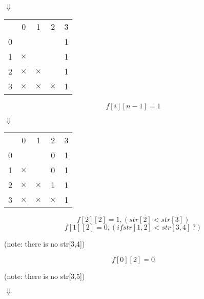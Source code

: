 \documentclass[a4paper,12pt]{article}
\begin{document}
\begin{center}
$\Downarrow$
\end{center}

\begin{center}
    \begin{tabular}{ r|c|c|c|c| }
        \multicolumn{1}{r}{} & \multicolumn{1}{c}{0} & \multicolumn{1}{c}{1} & \multicolumn{1}{c}{2} & \multicolumn{1}{c}{3}\\
        \cline{2-5}
        0 & \ & \ & \ & 1 \\
        \cline{2-5}
        1 & $\times$ & \ & \ & 1 \\
        \cline{2-5}
        2 & $\times$ & $\times$ & \ & 1 \\
        \cline{2-5}
        3 & $\times$ & $\times$ & $\times$ & 1 \\
        \cline{2-5}
    \end{tabular}
\end{center}

\[
f[i][n-1] = 1
\]

\begin{center}
$\Downarrow$
\end{center}

\begin{center}
    \begin{tabular}{ r|c|c|c|c| }
        \multicolumn{1}{r}{} & \multicolumn{1}{c}{0} & \multicolumn{1}{c}{1} & \multicolumn{1}{c}{2} & \multicolumn{1}{c}{3}\\
        \cline{2-5}
        0 & \ & \ & 0 & 1 \\
        \cline{2-5}
        1 & $\times$ & \ & 0 & 1 \\
        \cline{2-5}
        2 & $\times$ & $\times$ & 1 & 1 \\
        \cline{2-5}
        3 & $\times$ & $\times$ & $\times$ & 1 \\
        \cline{2-5}
    \end{tabular}
\end{center}

\[
f[2][2] = 1, (str[2] < str[3])
\]
\[
f[1][2] = 0, (if str[1,2] < str[3,4] \ ?)
\]
\begin{center}
(note: there is no str[3,4])
\end{center}
\[
f[0][2] = 0
\]
\begin{center}
(note: there is no str[3,5])
\end{center}

\begin{center}
$\Downarrow$
\end{center}
\end{document}
